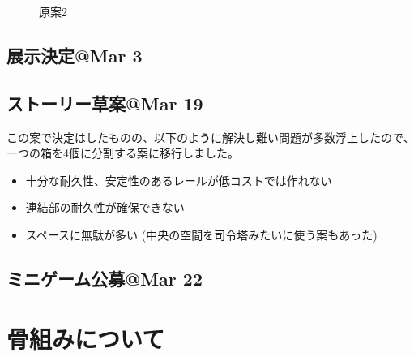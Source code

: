 \documentclass{jsarticle}
\begin{document}
\begin{figure}[htbp]
{        \label{fig:質問1}
    }
    \caption{原案2}
    \label{figs:原案2}
\end{figure}

\clearpage

\subsection{展示決定@Mar 3}
\subsection{ストーリー草案@Mar 19}

\clearpage

この案で決定はしたものの、以下のように解決し難い問題が多数浮上したので、一つの箱を4個に分割する案に移行しました。

\begin{itemize}
    \item 十分な耐久性、安定性のあるレールが低コストでは作れない
    \item 連結部の耐久性が確保できない
    \item スペースに無駄が多い (中央の空間を司令塔みたいに使う案もあった)
\end{itemize}

\subsection{ミニゲーム公募@Mar 22}

\section{骨組みについて}
\end{document}
